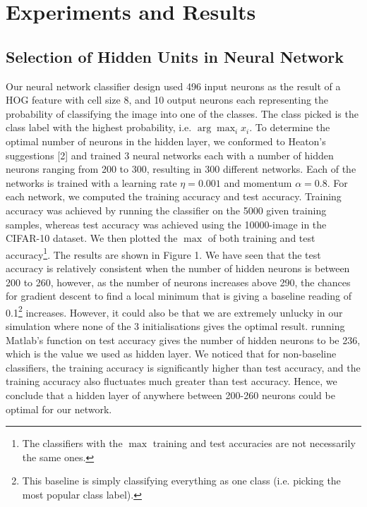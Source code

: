 \documentclass{article} %
\begin{document}
\section{Experiments and Results}

\subsection{Selection of Hidden Units in Neural Network}

Our neural network classifier design used 496 input neurons as the result of a HOG feature with cell size 8, and 10 output neurons each representing the probability of classifying the image into one of the classes. The class picked is the class label with the highest probability, i.e. $\arg\max_i {x_i}$. To determine the optimal number of neurons in the hidden layer, we conformed to Heaton's suggestions [2] and trained 3 neural networks each with a number of hidden neurons ranging from 200 to 300, resulting in 300 different networks. Each of the networks is trained with a learning rate $\eta=0.001$ and momentum $\alpha=0.8$. For each network, we computed the training accuracy and test accuracy. Training accuracy was achieved by running the classifier on the 5000 given training samples, whereas test accuracy was achieved using the 10000-image  in the CIFAR-10 dataset. We then plotted the $\max$ of both training and test accuracy\footnote{The classifiers with the $\max$ training and test accuracies are not necessarily the same ones.}. The results are shown in Figure 1. We have seen that the test accuracy is relatively consistent when the number of hidden neurons is between 200 to 260, however, as the number of neurons increases above 290, the chances for gradient descent to find a local minimum that is giving a baseline reading of 0.1\footnote{This baseline is simply classifying everything as one class (i.e. picking the most popular class label).} increases. However, it could also be that we are extremely unlucky in our simulation where none of the 3 initialisations gives the optimal result. running Matlab's  function on test accuracy gives the number of hidden neurons to be 236, which is the value we used as hidden layer. We noticed that for non-baseline classifiers, the training accuracy is significantly higher than test accuracy, and the training accuracy also fluctuates much greater than test accuracy. Hence, we conclude that a hidden layer of anywhere between 200-260 neurons could be optimal for our network.
\end{document}
